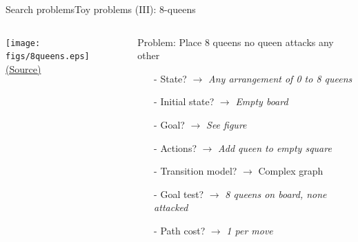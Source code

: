\documentclass[10pt,compress]{beamer} %
\begin{document}
\begin{frame}{Search problems}{Toy problems (III): 8-queens}
       \begin{columns}
	            \centering \texttt{[image: figs/8queens.eps]}\\
	            \tiny{\href{http://aima.cs.berkeley.edu/index.html}{(Source)}}
                \begin{exampleblock}{Problem: Place 8 queens no queen attacks any other}
                    \begin{itemize}
                    \item[-] State? $\rightarrow$ \textit{Any arrangement of 0 to 8 queens}
                    \item[-] Initial state? $\rightarrow$ \textit{Empty board}
                    \item[-] Goal? $\rightarrow$ \textit{See figure}
                    \item[-] Actions? $\rightarrow$ \textit{Add queen to empty square}
                    \item[-] Transition model? $\rightarrow$ Complex graph
                    \item[-] Goal test? $\rightarrow$ \textit{8 queens on board, none attacked}
                    \item[-] Path cost? $\rightarrow$ \textit{1 per move}
                    \end{itemize}
                \end{exampleblock}
      \end{columns}
\end{frame}
\end{document}
